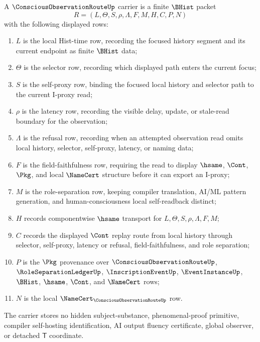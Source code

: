 \begin{definition}
\label{def:conscious-observation-route-carrier}
A $\ConsciousObservationRouteUp$ carrier is a finite $\BHist$ packet
$$
R=(L,\Theta,S,\rho,\Lambda,F,M,H,C,P,N)
$$
with the following displayed rows:
\begin{enumerate}
\item $L$ is the local Hist-time row, recording the focused history segment and its current endpoint as finite $\BHist$ data;
\item $\Theta$ is the selector row, recording which displayed path enters the current focus;
\item $S$ is the self-proxy row, binding the focused local history and selector path to the current I-proxy read;
\item $\rho$ is the latency row, recording the visible delay, update, or stale-read boundary for the observation;
\item $\Lambda$ is the refusal row, recording when an attempted observation read omits local history, selector, self-proxy, latency, or naming data;
\item $F$ is the field-faithfulness row, requiring the read to display $\hsame$, $\Cont$, $\Pkg$, and local $\NameCert$ structure before it can export an I-proxy;
\item $M$ is the role-separation row, keeping compiler translation, AI/ML pattern generation, and human-consciousness local self-readback distinct;
\item $H$ records componentwise $\hsame$ transport for $L,\Theta,S,\rho,\Lambda,F,M$;
\item $C$ records the displayed $\Cont$ replay route from local history through selector, self-proxy, latency or refusal, field-faithfulness, and role separation;
\item $P$ is the $\Pkg$ provenance over $\ConsciousObservationRouteUp$, $\RoleSeparationLedgerUp$, $\InscriptionEventUp$, $\EventInstanceUp$, $\BHist$, $\hsame$, $\Cont$, and $\NameCert$ rows;
\item $N$ is the local $\NameCert_{\ConsciousObservationRouteUp}$ row.
\end{enumerate}
The carrier stores no hidden subject-substance, phenomenal-proof primitive, compiler self-hosting identification, AI output fluency certificate, global observer, or detached $\mathsf{T}$ coordinate.
\end{definition}


